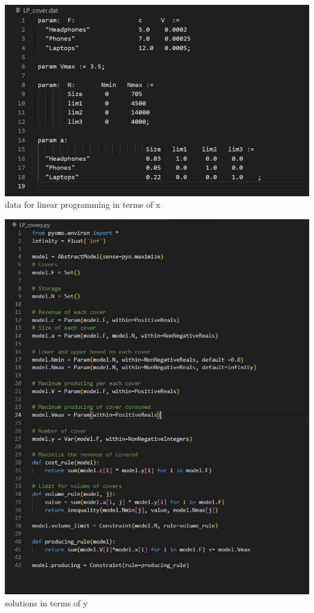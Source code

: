 \begin{center}
    \includegraphics[scale=0.6]{pictures/task_11_xdat.png} \\
    data for linear programming in terms of x
\end{center}

\begin{center}
\includegraphics[scale=0.9]{pictures/task_11_ypy.png} \\
solutions in terms of y
\end{center}

